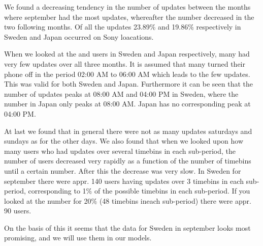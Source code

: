 We found a decreasing tendency in the number of updates between the months where september had the most updates, whereafter the number decreased in the two following months. Of all the updates 23.89\% and 19.86\% respectively in Sweden and Japan occurred on Sony loacations.  

When we looked at the \numberUsersSweden{} and \numberUsersJapan{} users in Sweden and Japan respectively, many had very few updates over all three months. It is assumed that many turned their phone off in the period 02:00 AM to 06:00 AM which leads to the few updates. This was valid for both Sweden and Japan. Furthermore it can be seen that the number of updates peaks at 08:00 AM and 04:00 PM in Sweden, where the number in Japan only peaks at 08:00 AM.  Japan has no corresponding peak at 04:00 PM. 

At last we found that in general there were not as many updates saturdays and sundays as for the other days. We also found that when we looked upon how many users who had updates over several timebins in each sub-period, the number of users decreased very rapidly as a function of the number of timebins until a certain number. After this the decrease was very slow. In Sweden for september there were appr. 140 users having updates over 3 timebins in each sub-period, corresponding to 1\% of the possible timebins in each sub-period. If you looked at the number for 20\% (48 timebins ineach sub-period) there were appr. 90  users. 

On the basis of this it seems that the data for Sweden in september looks most promising, and we will use them in our models. 